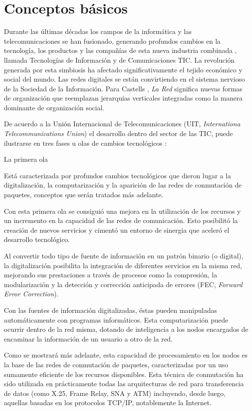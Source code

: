 \documentclass[
]{book}
\begin{document}
\hypertarget{requisitos}{%
\section{Conceptos básicos}\label{requisitos}}

Durante las últimas décadas los campos de la informática y las telecomunicaciones se han fusionado, generando profundos cambios en la tecnología, los productos y las compañías de esta nueva industria combinada \citep{Stallings:DCC}, llamada Tecnologías de Información y de Comunicaciones TIC. La revolución generada por esta simbiosis ha afectado significativamente el tejido económico y social del mundo. Las redes digitales se están convirtiendo en el sistema nervioso de la Sociedad de la Información. Para Castells \citep{Castells:RNS}, \emph{La Red} significa nuevas formas de organización que reemplazan jerarquías verticales integradas como la manera dominante de organización social.

De acuerdo a la Unión Internacional de Telecomunicaciones (UIT, \emph{Internationa Telecommunications Union}) el desarrollo dentro del sector de las TIC, puede ilustrarse en tres fases u olas de cambios tecnológicos \citep{ICT:RT}:

La primera ola

Está caracterizada por profundos cambios tecnológicos que dieron lugar a la digitalización, la computarización y la aparición de las redes de conmutación de paquetes, conceptos que serán tratados más adelante.

Con esta primera ola se consiguió una mejora en la utilización de los recursos y un incremento en la capacidad de las redes de comunicación. Esto posibilitó la creación de nuevos servicios y cimentó un entorno de sinergia que aceleró el desarrollo tecnológico.

Al convertir todo tipo de fuente de información en un patrón binario (o digital), la digitalización posibilita la integración de diferentes servicios en la misma red, mejorando sus prestaciones a través de procesos como la compresión, la modularización y la detección y corrección anticipada de errores (FEC, \emph{Forward Error Correction}).

Con las fuentes de información digitalizadas, éstas pueden manipuladas automáticamente con programas informáticos. Esta computarización puede ocurrir dentro de la red misma, dotando de inteligencia a los nodos encargados de encaminar la información de un usuario a otro de la red.

Como se mostrará más adelante, esta capacidad de procesamiento en los nodos es la base de las redes de conmutación de paquetes, caracterizadas por un uso sumamente eficiente de los recursos disponibles. Esta técnica de conmutación ha sido utilizada en prácticamente todas las arquitecturas de red para transferencia de datos (como X.25, Frame Relay, SNA y ATM) incluyendo, desde luego, aquellas basadas en los protocolos TCP/IP, notablemente la Internet.
\end{document}
